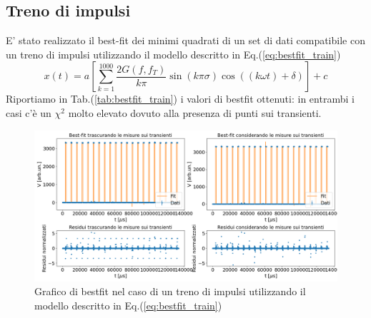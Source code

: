 \documentclass{article}
\begin{document}
    \subsection{Treno di impulsi}
        E' stato realizzato il best-fit dei minimi quadrati
        di un set di dati compatibile con un treno di impulsi utilizzando il modello descritto in Eq.(\ref{eq:bestfit_train})
        \begin{equation}
            x(t) = a \left[\sum_{k=1}^{1000} \frac{2 G(f, f_T)}{k\pi} \sin{\left( k \pi \sigma \right)} \cos{\left((k \omega t) + \delta\right)}\right] + c
        \label{eq:bestfit_train}
        \end{equation}
        Riportiamo in Tab.(\ref{tab:bestfit_train}) i valori di bestfit ottenuti: in entrambi i casi c'è un $\chi^2$
        molto elevato dovuto alla presenza di punti sui transienti.
            \begin{figure}[H]            
                \centering
                \includegraphics[width=1\textwidth]{bestfit_train.png} %
                \caption{Grafico di bestfit nel caso di un treno di impulsi utilizzando il modello descritto in Eq.(\ref{eq:bestfit_train})
                }
                \label{fig:bestfit_train}
            \end{figure}    
\end{document}
